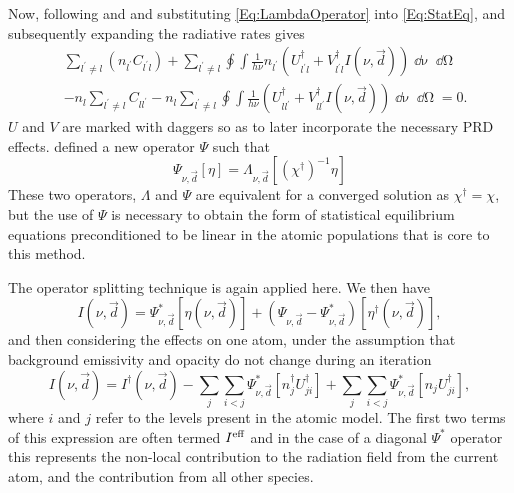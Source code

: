 Now, following \citet{Rybicki1992} and \citet{Uitenbroek2001} and substituting \eqref{Eq:LambdaOperator} into \eqref{Eq:StatEq}, and subsequently expanding the radiative rates gives
\begin{equation}
\begin{aligned}
   &\sum_{l^\prime\neq l} (n_{l^\prime}C_{l^\prime l}) +
   \sum_{l^\prime\neq l} \oint \int \frac{1}{h\nu} n_{l^\prime} (U^\dagger_{l^\prime l} + V^\dagger_{l^\prime l} I(\nu, \vec{d})) \mathop{\dd{}\nu}\mathop{\dd{}\Omega}\\
   &\mathop{-} n_l \sum_{l^\prime\neq l} C_{l l^\prime} -
   n_l \sum_{l^\prime\neq l} \oint \int \frac{1}{h\nu} (U^\dagger_{l l^\prime} + V^\dagger_{l l^\prime} I(\nu, \vec{d})) \mathop{\dd{}\nu}\mathop{\dd{}\Omega}
   = 0.
   \label{Eq:StatEqExpanded}
\end{aligned}
\end{equation}
$U$ and $V$ are marked with daggers so as to later incorporate the necessary PRD effects.
\citet{Rybicki1992} defined a new operator $\Psi$ such that
\begin{equation}
    \Psi_{\nu, \vec{d}}[\eta] = \Lambda_{\nu, \vec{d}}[(\chi^\dagger)^{-1}\eta]
\end{equation}
These two operators, $\Lambda$ and $\Psi$ are equivalent for a converged solution as $\chi^\dagger = \chi$, but the use of $\Psi$ is necessary to obtain the form of statistical equilibrium equations preconditioned to be linear in the atomic populations that is core to this method.

The operator splitting technique is again applied here. We then have
\begin{equation}
    I(\nu, \vec{d}) = \Psi_{\nu,\vec{d}}^*[\eta(\nu, \vec{d})] + (\Psi_{\nu,\vec{d}}- \Psi_{\nu, \vec{d}}^*)[\eta^\dagger(\nu, \vec{d})],
\end{equation}
and then considering the effects on one atom, under the assumption that background emissivity and opacity do not change during an iteration
\begin{equation}
    I(\nu, \vec{d}) = I^\dagger(\nu, \vec{d})
                    - \sum_j\sum_{i<j}\Psi_{\nu,\vec{d}}^*[n^\dagger_j U^\dagger_{ji}]
                    + \sum_j\sum_{i<j}\Psi_{\nu,\vec{d}}^*[n_j U^\dagger_{ji}],
\end{equation}
where $i$ and $j$ refer to the levels present in the atomic model.
The first two terms of this expression are often termed $I^\textnormal{eff}$ and in the case of a diagonal $\Psi^*$ operator this represents the non-local contribution to the radiation field from the current atom, and the contribution from all other species.

